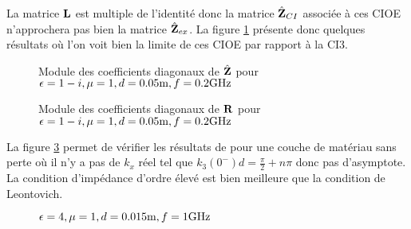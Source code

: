      La matrice \(\mathbf{L}\) est multiple de l'identité donc la matrice \(\hat{\mathbf{Z}}_{CI}\) associée à ces CIOE n'approchera pas bien la matrice \(\hat{\mathbf{Z}}_{ex}\). La figure \ref{fig:imp_fourier:plan:stupfel:hoibc} présente donc quelques résultats où l'on voit bien la limite de ces CIOE par rapport à la CI3.
      \begin{figure}[!hbt]
        \centering
        
        \caption[CIOE sur empilement de B.~Stupfel p.~1661]{Module des coefficients diagonaux de \(\hat{\mathbf{Z}}\) pour \(\epsilon = 1-i, \mu = 1, d=0.05\text{m}, f=0.2\text{GHz}\)}
        \label{fig:imp_fourier:plan:stupfel:hoibc}
      \end{figure}
      \begin{table}[!hbt]
        \centering

        \caption{Coefficients associés à la figure \ref{fig:imp_fourier:plan:stupfel:hoibc}}
        \label{tab:imp_fourier:plan:stupfel:hoibc}
      \end{table}
      
      \begin{figure}[!hbt]
        \centering
        
        \caption[CIOE sur empilement de B.~Stupfel p.~1661]{Module des coefficients diagonaux de \(\mathbf{R}\) pour \(\epsilon = 1-i, \mu = 1, d=0.05\text{m}, f=0.2\text{GHz}\)}
        \label{fig:reflex_fourier:plan:stupfel:hoibc}
      \end{figure}

      La figure \ref{fig:imp_fourier:plan:hoppe:33:hoibc} permet de vérifier les résultats de \cite[p.~33]{hoppe_impedance_1995} pour une couche de matériau sans perte où il n'y a pas de \(k_x\) réel tel que \(k_3(0^-)d=\frac{\pi}{2} + n \pi\) donc pas d'asymptote. La condition d'impédance d'ordre élevé est bien meilleure que la condition de Leontovich.
      \begin{figure}[!hbt]
          \centering
          
          \caption[CIOE sur empilement de Hoppe & Rahmat-Samii p.~33]{\(\epsilon = 4, \mu = 1, d=0.015\text{m}, f=1\text{GHz}\)}
          \label{fig:imp_fourier:plan:hoppe:33:hoibc}
      \end{figure}
      \begin{table}[!hbt]
        \centering
        \caption{Coefficients associés à la figure \ref{fig:imp_fourier:plan:hoppe:33:hoibc}}
        \label{tab:imp_fourier:plan:hoppe:33:hoibc}
      \end{table}

